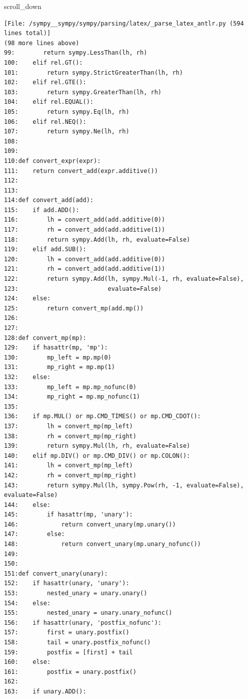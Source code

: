 {\begin{agentbox}
\hrulefill
\begin{CodeVerbatim}[breaklines=true, breakanywhere=true]
scroll_down
\end{CodeVerbatim}
\end{agentbox}
\begin{observationbox}\begin{Verbatim}[breaklines=true, breakanywhere=true]
[File: /sympy__sympy/sympy/parsing/latex/_parse_latex_antlr.py (594 lines total)]
(98 more lines above)
99:        return sympy.LessThan(lh, rh)
100:    elif rel.GT():
101:        return sympy.StrictGreaterThan(lh, rh)
102:    elif rel.GTE():
103:        return sympy.GreaterThan(lh, rh)
104:    elif rel.EQUAL():
105:        return sympy.Eq(lh, rh)
106:    elif rel.NEQ():
107:        return sympy.Ne(lh, rh)
108:
109:
110:def convert_expr(expr):
111:    return convert_add(expr.additive())
112:
113:
114:def convert_add(add):
115:    if add.ADD():
116:        lh = convert_add(add.additive(0))
117:        rh = convert_add(add.additive(1))
118:        return sympy.Add(lh, rh, evaluate=False)
119:    elif add.SUB():
120:        lh = convert_add(add.additive(0))
121:        rh = convert_add(add.additive(1))
122:        return sympy.Add(lh, sympy.Mul(-1, rh, evaluate=False),
123:                         evaluate=False)
124:    else:
125:        return convert_mp(add.mp())
126:
127:
128:def convert_mp(mp):
129:    if hasattr(mp, 'mp'):
130:        mp_left = mp.mp(0)
131:        mp_right = mp.mp(1)
132:    else:
133:        mp_left = mp.mp_nofunc(0)
134:        mp_right = mp.mp_nofunc(1)
135:
136:    if mp.MUL() or mp.CMD_TIMES() or mp.CMD_CDOT():
137:        lh = convert_mp(mp_left)
138:        rh = convert_mp(mp_right)
139:        return sympy.Mul(lh, rh, evaluate=False)
140:    elif mp.DIV() or mp.CMD_DIV() or mp.COLON():
141:        lh = convert_mp(mp_left)
142:        rh = convert_mp(mp_right)
143:        return sympy.Mul(lh, sympy.Pow(rh, -1, evaluate=False), evaluate=False)
144:    else:
145:        if hasattr(mp, 'unary'):
146:            return convert_unary(mp.unary())
147:        else:
148:            return convert_unary(mp.unary_nofunc())
149:
150:
151:def convert_unary(unary):
152:    if hasattr(unary, 'unary'):
153:        nested_unary = unary.unary()
154:    else:
155:        nested_unary = unary.unary_nofunc()
156:    if hasattr(unary, 'postfix_nofunc'):
157:        first = unary.postfix()
158:        tail = unary.postfix_nofunc()
159:        postfix = [first] + tail
160:    else:
161:        postfix = unary.postfix()
162:
163:    if unary.ADD():

\end{Verbatim}
\end{observationbox}}
